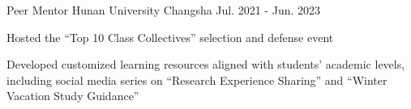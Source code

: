 \vspace{4.0mm}  
\cventry
{Peer Mentor} %
{Hunan University} %
{Changsha}
{Jul. 2021 - Jun. 2023}
{	
	\begin{cvitems} %
		\item{Hosted the ``Top 10 Class Collectives'' selection and defense event}
		\item{Developed customized learning resources aligned with students' academic levels, including social media series on ``Research Experience Sharing'' and ``Winter Vacation Study Guidance''}
	\end{cvitems}
	\vspace{4mm}
} 